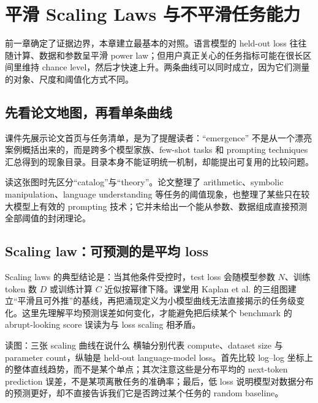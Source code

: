 \section{平滑 Scaling Laws 与不平滑任务能力}

前一章确定了证据边界，本章建立最基本的对照。语言模型的 held-out loss 往往随计算、数据和参数呈平滑 power law；但用户真正关心的任务指标可能在很长区间里维持 chance level，然后才快速上升。两条曲线可以同时成立，因为它们测量的对象、尺度和阈值化方式不同。

\subsection{先看论文地图，再看单条曲线}

课件先展示论文首页与任务清单，是为了提醒读者：``emergence'' 不是从一个漂亮案例概括出来的，而是跨多个模型家族、few-shot tasks 和 prompting techniques 汇总得到的现象目录。目录本身不能证明统一机制，却能提出可复用的比较问题。


读这张图时先区分“catalog”与“theory”。论文整理了 arithmetic、symbolic manipulation、language understanding 等任务的阈值现象，也整理了某些只在较大模型上有效的 prompting 技术；它并未给出一个能从参数、数据组成直接预测全部阈值的封闭理论。

\subsection{Scaling law：可预测的是平均 loss}

Scaling laws 的典型结论是：当其他条件受控时，test loss 会随模型参数 $N$、训练 token 数 $D$ 或训练计算 $C$ 近似按幂律下降。课堂用 Kaplan et al. 的三组图建立“平滑且可外推”的基线，再把涌现定义为小模型曲线无法直接揭示的任务级变化。这里先理解平均预测误差如何变化，才能避免把后续某个 benchmark 的 abrupt-looking score 误读为与 loss scaling 相矛盾。


\begin{knowledgebox}{读图：三张 scaling 曲线在说什么}
横轴分别代表 compute、dataset size 与 parameter count，纵轴是 held-out language-model loss。首先比较 log--log 坐标上的整体直线趋势，而不是某个单点；其次注意这些是分布平均的 next-token prediction 误差，不是某项离散任务的准确率；最后，低 loss 说明模型对数据分布的预测更好，却不直接告诉我们它是否跨过某个任务的 random baseline。
\end{knowledgebox}

